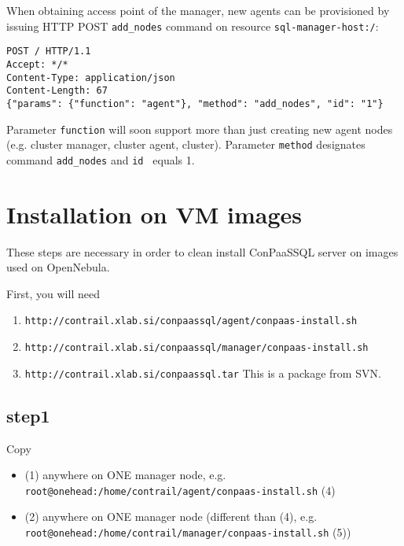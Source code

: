\documentclass[a4paper,10pt]{article}
\begin{document}
When obtaining access point of the manager, new agents can be provisioned by issuing HTTP POST {\tt add\_nodes} command on resource {\tt sql-manager-host:/}:

\begin{verbatim}
POST / HTTP/1.1
Accept: */*
Content-Type: application/json
Content-Length: 67
{"params": {"function": "agent"}, "method": "add_nodes", "id": "1"}
\end{verbatim}

Parameter {\tt function} will soon support more than just creating new agent nodes (e.g. cluster manager, cluster agent, cluster). Parameter {\tt method} designates command {\tt add\_nodes} and {\tt id } equals 1. 

\section{Installation on VM images}
\label{sec:install}

These steps are necessary in order to clean install ConPaaSSQL server on images used on OpenNebula.

First, you will need
\begin{enumerate}
\item {\tt http://contrail.xlab.si/conpaassql/agent/conpaas-install.sh}
\item {\tt http://contrail.xlab.si/conpaassql/manager/conpaas-install.sh}
\item {\tt http://contrail.xlab.si/conpaassql.tar} This is a package from SVN.
\end{enumerate}

\subsection*{step1}

Copy
\begin{itemize}
\item (1) anywhere on ONE manager node, e.g. \\ {\tt root@onehead:/home/contrail/agent/conpaas-install.sh} (4)
\item (2) anywhere on ONE manager node (different than (4), e.g. \\ {\tt root@onehead:/home/contrail/manager/conpaas-install.sh} (5))
\end{itemize}
\end{document}
